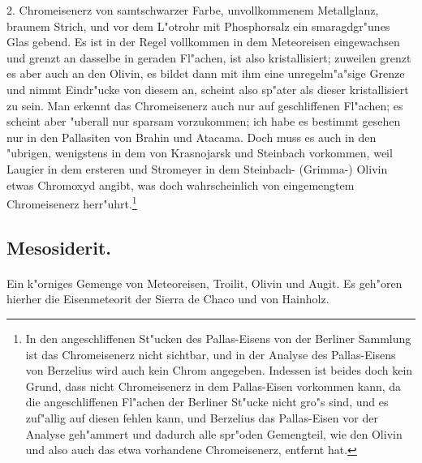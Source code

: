 \documentclass[a4paper, 11pt, oneside]{article}
\begin{document}
2. Chromeisenerz von samtschwarzer Farbe, unvollkommenem Metallglanz, braunem Strich, und vor dem L"otrohr mit Phosphorsalz ein smaragdgr"unes Glas gebend. Es ist in der Regel vollkommen in dem Meteoreisen eingewachsen und grenzt an dasselbe in geraden Fl"achen, ist also kristallisiert; zuweilen grenzt es aber auch an den Olivin, es bildet dann mit ihm eine unregelm"a"sige Grenze und nimmt Eindr"ucke von diesem an, scheint also sp"ater als dieser kristallisiert zu sein. Man erkennt das Chromeisenerz auch nur auf geschliffenen Fl"achen; es scheint aber "uberall nur sparsam vorzukommen; ich habe es bestimmt gesehen nur in den Pallasiten von Brahin und Atacama. Doch muss es auch in den "ubrigen, wenigstens in dem von Krasnojarsk und Steinbach vorkommen, weil Laugier in dem ersteren und Stromeyer in dem Steinbach- (Grimma-) Olivin etwas Chromoxyd angibt, was doch wahrscheinlich von eingemengtem Chromeisenerz herr"uhrt.\footnote{In den angeschliffenen St"ucken des Pallas-Eisens von der Berliner Sammlung ist das Chromeisenerz nicht sichtbar, und in der Analyse des Pallas-Eisens von Berzelius wird auch kein Chrom angegeben. Indessen ist beides doch kein Grund, dass nicht Chromeisenerz in dem Pallas-Eisen vorkommen kann, da die angeschliffenen Fl"achen der Berliner St"ucke nicht gro"s sind, und es zuf"allig auf diesen fehlen kann, und Berzelius das Pallas-Eisen vor der Analyse geh"ammert und dadurch alle spr"oden Gemengteil, wie den Olivin und also auch das etwa vorhandene Chromeisenerz, entfernt hat.}
\subsection{Mesosiderit.}
\paragraph{}
Ein k"orniges Gemenge von Meteoreisen, Troilit, Olivin und Augit. Es geh"oren hierher die Eisenmeteorit der Sierra de Chaco und von Hainholz.
\end{document}
